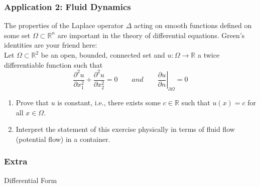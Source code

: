 \documentclass[11pt, t]{beamer}
\newcommand{\nullspace}{~\\[15pt]}
\begin{document}
\begin{frame}
    \frametitle{Application 2: Fluid Dynamics}
    The properties of the Laplace operator $\Delta$ acting on smooth functions defined on some set $\Omega \subset \mathbb{R}^{n}$ are important in the theory of differential equations. Green's identities are your friend here:
    \nullspace
    Let $\Omega \subset \mathbb{R}^{2}$ be an open, bounded, connected set and $u: \Omega \rightarrow \mathbb{R}$ a twice differentiable function such that
    \[
        \frac{\partial^{2} u}{\partial x_{1}^{2}}+\frac{\partial^{2} u}{\partial x_{2}^{2}}=0
    \qquad and \qquad
        \left.\frac{\partial u}{\partial n}\right|_{\partial \Omega}=0
    \]
    \begin{enumerate}
        \item Prove that $u$ is constant, i.e., there exists some $c \in \mathbb{R}$ such that $u(x)=c$ for all $x \in \Omega$.
        \item Interpret the statement of this exercise physically in terms of fluid flow (potential flow) in a container.
    \end{enumerate}
\end{frame}

\begin{frame}
    \frametitle{Extra}
    \vfill
    \begin{center}
        \LARGE
        Differential Form
    \end{center}
    \vfill
\end{frame}
\end{document}

